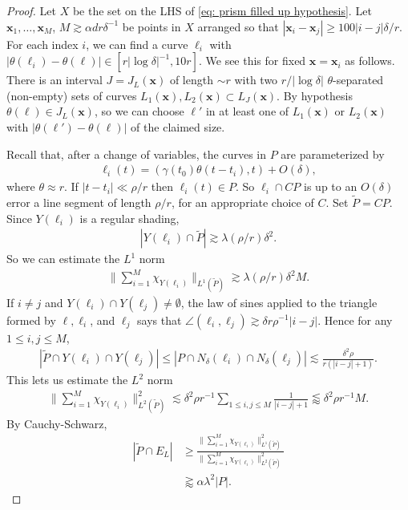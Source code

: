 \documentclass[12pt]{amsart}
\newcommand{\x}{{\bf{x}}}
\numberwithin{equation}{section}
\newcommand{\1}{\mathbbm{1}}
\renewcommand{\x}{\mathbf x}
\begin{document}
\begin{proof}
    Let $X$ be the set on the LHS of \eqref{eq: prism filled up hypothesis}. Let $\x_1,\ldots, \x_M$, $M \gtrsim \alpha d r \delta^{-1}$ be points in $X$ arranged so that $|\x_i - \x_j| \geq 100 |i - j| \delta /r$. For each index $i$, we can find a curve $\ell_i$ with $|\theta(\ell_i) - \theta(\ell)| \in [r |\log \delta|^{-1}, 10r]$. We see this for fixed $\x = \x_i$ as follows. There is an interval $J = J_L(\x)$ of length $\sim r$ with two $r/|\log \delta|$ $\theta$-separated (non-empty) sets of curves $L_1(\x), L_2(\x) \subset L_J(\x)$. By hypothesis $\theta(\ell) \in J_L(\x)$, so we can choose $\ell'$ in at least one of $L_1(\x)$ or $L_2(\x)$ with $|\theta(\ell') - \theta(\ell)|$ of the claimed size.

    Recall that, after a change of variables, the curves in $P$ are parameterized by 
    \begin{align}
        \ell_i(t) = (\gamma(t_0) \theta (t - t_i), t) + O(\delta),
    \end{align}
    where $\theta \approx r$. If $|t - t_i| \ll \rho /r$ then $\ell_{i}(t) \in P$. So $\ell_i \cap CP$ is up to an $O(\delta)$ error a line segment of length $\rho / r$, for an appropriate choice of $C$. Set $\tilde P = CP$. Since $Y(\ell_i)$ is a regular shading, 
    \begin{align}
        |Y(\ell_i) \cap \tilde P| \gtrsim \lambda (\rho /r) \delta^2.
    \end{align}
    So we can estimate the $L^1$ norm 
    \begin{align}
        \Big \| \sum_{i=1}^M \chi_{Y(\ell_i)}\Big \|_{L^1(\tilde P)} \gtrsim \lambda (\rho / r) \delta^2 M.
    \end{align}
    If $i \neq j$ and $Y(\ell_i) \cap Y(\ell_j) \neq \emptyset$, the law of sines applied to the triangle formed by $\ell, \ell_i$, and $\ell_j$ says that $\angle(\ell_i,\ell_j) \gtrsim \delta r \rho^{-1} |i - j|$. Hence for any $1 \leq i,j \leq M$,
    \begin{align}
        |\tilde P \cap Y(\ell_i) \cap Y(\ell_j)| \leq |P \cap N_\delta(\ell_i) \cap N_\delta(\ell_j)| \lesssim \frac{\delta^2 \rho}{r(|i - j| + 1)}.
    \end{align}
    This lets us estimate the $L^2$ norm
    \begin{align}
        \Big \| \sum_{i=1}^M \chi_{Y(\ell_i)}\Big \|_{L^2(\tilde P)}^2 \lesssim \delta^2 \rho r^{-1} \sum_{1 \leq i,j \leq M} \frac{1}{|i -j| + 1} \lessapprox \delta^2 \rho r^{-1} M. 
    \end{align}
    By Cauchy-Schwarz, 
    \begin{align}
        |\tilde P \cap E_L| &\geq 
        \frac{\|\sum_{i=1}^M \chi_{Y(\ell_i)}\|_{L^1(\tilde P)}^2}{\| \sum_{i=1}^M \chi_{Y(\ell_i)}\|_{L^2(\tilde P)}^2} \\
        &\gtrapprox \alpha \lambda^2 |P|.
    \end{align}
    
\end{proof}
\end{document}
